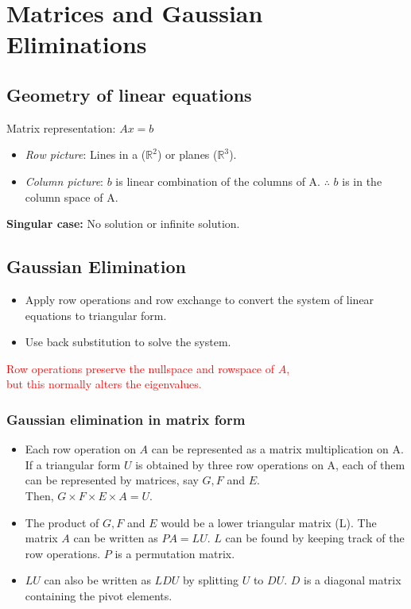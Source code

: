 \section{Matrices and Gaussian Eliminations}

\subsection{Geometry of linear equations}

Matrix representation: $Ax = b$ \\%

\begin{itemize}
\item \textit{Row picture}: Lines in a ($\mathbb{R}^2$) or planes ($\mathbb{R}^3$).
\item \textit{Column picture}: $b$ is linear combination of the columns of A. $\therefore$ $b$ is in the column space of A. 
\end{itemize}

\textbf{Singular case:} No solution or infinite solution.\\

\subsection{Gaussian Elimination}
\begin{itemize}
	\item Apply row operations and row exchange to convert the system of linear equations to triangular form.
	\item Use back substitution to solve the system.
\end{itemize}

\textcolor{red}{Row operations  preserve the nullspace and rowspace of $A$,\\ but this normally alters the eigenvalues.}

\subsubsection{Gaussian elimination in matrix form}

\begin{itemize}
	\item Each row operation on $A$ can be represented as a matrix multiplication on A. If a triangular form $U$ is obtained by three row operations on A, each of them can be represented by matrices, say $G, F$ and $E$.\\
	Then, $G \times F \times E \times A = U$.
	\item The product of $G, F$ and $E$ would be a lower triangular matrix (L). The matrix $A$ can be written as $PA = LU$. $L$ can be found by keeping track of the row operations. $P$ is a permutation matrix.
	\item $LU$ can also be written as $LDU$ by splitting $U$ to $DU$. $D$ is a diagonal matrix containing the pivot elements.
\end{itemize}

